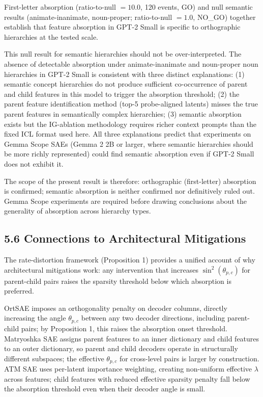 \documentclass{article}
\begin{document}
First-letter absorption (ratio-to-null $= 10.0$, 120 events, GO) and null semantic results
(animate-inanimate, noun-proper; ratio-to-null $= 1.0$, NO\_GO) together establish that
feature absorption in GPT-2 Small is specific to orthographic hierarchies at the tested scale.

This null result for semantic hierarchies should not be over-interpreted. The absence of
detectable absorption under animate-inanimate and noun-proper noun hierarchies in GPT-2 Small
is consistent with three distinct explanations: (1) semantic concept hierarchies do not produce
sufficient co-occurrence of parent and child features in this model to trigger the absorption
threshold; (2) the parent feature identification method (top-5 probe-aligned latents) misses the
true parent features in semantically complex hierarchies; (3) semantic absorption exists but the
IG-ablation methodology requires richer context prompts than the fixed ICL format used here.
All three explanations predict that experiments on Gemma Scope SAEs (Gemma 2 2B or larger, where
semantic hierarchies should be more richly represented) could find semantic absorption even if
GPT-2 Small does not exhibit it.

The scope of the present result is therefore: orthographic (first-letter) absorption is
confirmed; semantic absorption is neither confirmed nor definitively ruled out. Gemma Scope
experiments are required before drawing conclusions about the generality of absorption across
hierarchy types.

\subsection{5.6 Connections to Architectural Mitigations}

The rate-distortion framework (Proposition 1) provides a unified account of why architectural
mitigations work: any intervention that increases $\sin^2(\theta_{p,c})$ for parent-child pairs
raises the sparsity threshold below which absorption is preferred.

OrtSAE imposes an orthogonality penalty on decoder columns, directly increasing the angle
$\theta_{p,c}$ between any two decoder directions, including parent-child pairs; by Proposition 1,
this raises the absorption onset threshold. Matryoshka SAE assigns parent features to an inner
dictionary and child features to an outer dictionary, so parent and child decoders operate in
structurally different subspaces; the effective $\theta_{p,c}$ for cross-level pairs is larger
by construction. ATM SAE uses per-latent importance weighting, creating non-uniform effective
$\lambda$ across features; child features with reduced effective sparsity penalty fall below the
absorption threshold even when their decoder angle is small.
\end{document}
